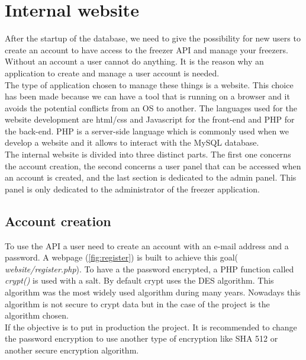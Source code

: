 \section{Internal website}
After the startup of the database, we need to give the possibility for new users to create an account to have access to the freezer API and manage your freezers. Without an account a user cannot do anything. It is the reason why an application to create and manage a user account is needed.\\

The type of application chosen to manage these things is a website. This choice has been made because we can have a tool that is running on a browser and it avoids the potential conflicts from an OS to another. The languages used for the website development are html/css and Javascript for the front-end and PHP for the back-end. PHP is a server-side language which is commonly used when we develop a website and it allows to interact with the MySQL database. \\

The internal website is divided into three distinct parts. The first one concerns the account creation, the second concerns a user panel that can be accessed when an account is created, and the last section is dedicated to the admin panel. This panel is only dedicated to the administrator of the freezer application.


\subsection{Account creation}
To use the API a user need to create an account with an e-mail address and a password. A webpage (\autoref{fig:register}) is built to achieve this goal( \textit{website/register.php}). To have a the password encrypted, a PHP function called \textit{crypt()} is used with a salt. By default crypt uses the DES algorithm. This algorithm was the most widely used algorithm during many years. Nowadays this algorithm is not secure to crypt data but in the case of the project is the algorithm chosen.\\
If the objective is to put in production the project. It is recommended to change the password encryption to use another type of encryption like SHA 512 or another secure encryption algorithm.\\

